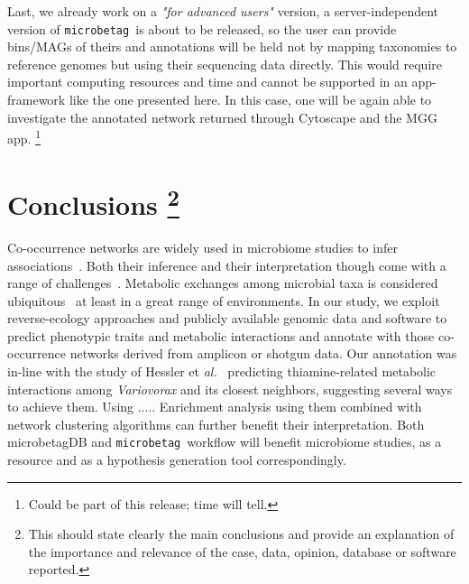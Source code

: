 \documentclass[sn-mathphys,Numbered]{sn-jnl}  %
\theoremstyle{thmstyleone}%
\theoremstyle{thmstyletwo}%
\theoremstyle{thmstylethree}%
\newcommand{\microbetag}{\texttt{microbetag }}
\begin{document}
        Last, we already work on a \textit{"for advanced users"} version, a server-independent version of \microbetag is about to be released, so the user can provide bins/MAGs of theirs and annotations will be held not by mapping taxonomies to reference genomes but using their sequencing data directly.
        This would require important computing resources and time and cannot be supported in an app-framework like the one presented here. 
        In this case, one will be again able to investigate the annotated network returned through Cytoscape and the MGG app.
        \footnote{Could be part of this release; time will tell.}




\section*{Conclusions
\footnote{
    This should state clearly the main conclusions and provide an explanation of the importance and relevance of the case, data, opinion, database or software reported.
}
}
\label{sec:conclusions}


    Co-occurrence networks are widely used in microbiome studies to infer associations~\cite{rottjers2018hairballs}. 
    Both their inference and their interpretation though come with a range of challenges~\cite{faust2021open}.
    Metabolic exchanges among microbial taxa is considered ubiquitous~\cite{kost2023metabolic} at least in a great range of environments. 
    In our study, we exploit reverse-ecology approaches and publicly available genomic data and software to predict phenotypic traits and metabolic interactions and annotate with those co-occurrence networks derived from amplicon or shotgun data.
    Our annotation was in-line with the study of Hessler et \textit{al.}~\cite{hessler2023vitamin} predicting thiamine-related metabolic interactions among \textit{Variovorax} and its closest neighbors, suggesting several ways to achieve them. 
    Using ..... 
    Enrichment analysis using them combined with network clustering algorithms can further benefit their interpretation. 
    Both microbetagDB and \microbetag workflow will benefit microbiome studies, as a resource and as a hypothesis generation tool correspondingly.
\end{document}

